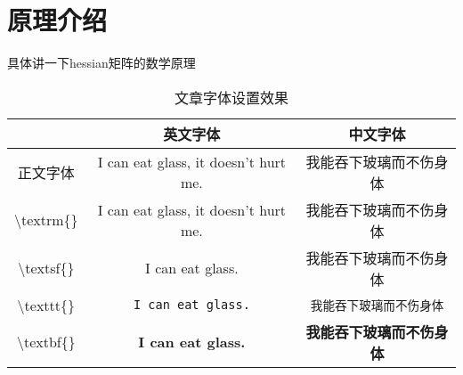 \section{原理介绍}
具体讲一下hessian矩阵的数学原理
\begin{table}[htb]
	\caption{文章字体设置效果}
	\label{tab:文章字体设置效果}
	\begin{center}
		\begin{tabular}{ccc}
			\toprule
					& 英文字体 & 中文字体  \\
			\midrule
			正文字体 & I can eat glass, it doesn't hurt me. & 我能吞下玻璃而不伤身体 \\
			\textbackslash textrm\{\} & \textrm{I can eat glass, it doesn't hurt me.} & \textrm{我能吞下玻璃而不伤身体} \\
			\textbackslash textsf\{\} & \textsf{I can eat glass.} & \textsf{我能吞下玻璃而不伤身体} \\
			\textbackslash texttt\{\} & \texttt{I can eat glass.} & \texttt{我能吞下玻璃而不伤身体} \\
			\textbackslash textbf\{\} & \textbf{I can eat glass.} & \textbf{我能吞下玻璃而不伤身体} \\
			\bottomrule
		\end{tabular}
	\end{center}
\end{table}

